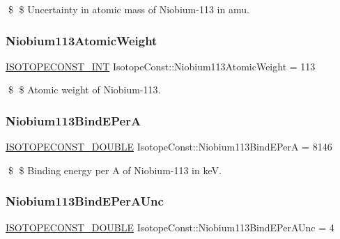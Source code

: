 \$ \$ Uncertainty in atomic mass of Niobium-\/113 in amu. \mbox{\label{group___isotope_const-_niobium-_nb113_gab1531942198913e0e56090a687e421e2}} 
\subsubsection{\texorpdfstring{Niobium113\+Atomic\+Weight}{Niobium113AtomicWeight}}
{\footnotesize\ttfamily \mbox{\hyperlink{group___isotope_const-_macros_ga5f18360b3e99483a35c32d789e62621c}{I\+S\+O\+T\+O\+P\+E\+C\+O\+N\+S\+T\+\_\+\+I\+NT}} Isotope\+Const\+::\+Niobium113\+Atomic\+Weight = 113}

\$ \$ Atomic weight of Niobium-\/113. \mbox{\label{group___isotope_const-_niobium-_nb113_ga79510aee5fe18feb6261d11585612c91}} 
\subsubsection{\texorpdfstring{Niobium113\+Bind\+E\+PerA}{Niobium113BindEPerA}}
{\footnotesize\ttfamily \mbox{\hyperlink{group___isotope_const-_macros_ga8f45a7272ce02c0b4c65c44636ed719a}{I\+S\+O\+T\+O\+P\+E\+C\+O\+N\+S\+T\+\_\+\+D\+O\+U\+B\+LE}} Isotope\+Const\+::\+Niobium113\+Bind\+E\+PerA = 8146}

\$ \$ Binding energy per A of Niobium-\/113 in keV. \mbox{\label{group___isotope_const-_niobium-_nb113_ga5871667272c33110ca1236c5a9324ee3}} 
\subsubsection{\texorpdfstring{Niobium113\+Bind\+E\+Per\+A\+Unc}{Niobium113BindEPerAUnc}}
{\footnotesize\ttfamily \mbox{\hyperlink{group___isotope_const-_macros_ga8f45a7272ce02c0b4c65c44636ed719a}{I\+S\+O\+T\+O\+P\+E\+C\+O\+N\+S\+T\+\_\+\+D\+O\+U\+B\+LE}} Isotope\+Const\+::\+Niobium113\+Bind\+E\+Per\+A\+Unc = 4}


